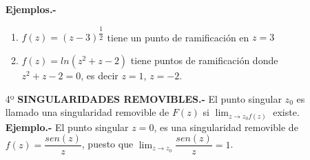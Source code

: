 \documentclass[10pt,a4paper]{article}
\begin{document}
\begin{enumerate}
\textbf{Ejemplos.-} \\
\begin{enumerate}
\item $\displaystyle{f(z) = (z-3)^{\dfrac{1}{2}}}$ tiene un punto de ramificación en $z = 3$
\item $f(z) = ln (z^2 + z -2)$ tiene puntos de ramificación donde $z^2+z-2 = 0$, es decir $z = 1$, $z = -2$. 
\end{enumerate}
\item[4º] \textbf{SINGULARIDADES REMOVIBLES.-} El punto singular $z_0$ es llamado una singularidad removible de $F(z)$ si $\lim_{z \to z_0 f(z)}$ existe.\\
\textbf{Ejemplo.-} El punto singular $z = 0$, es una singularidad removible de $f(z) = \dfrac{sen(z)}{z}$, puesto que $\lim_{z \to z_0} \dfrac{sen (z)}{z} = 1$.
\end{enumerate}
\end{document}
